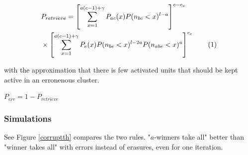 \documentclass[english,10pt,twocolumn]{IEEEtran}
\newcommand\numberthis{\addtocounter{equation}{1}\tag{\theequation}}
\theoremstyle{definition}
\begin{document}
		\begin{align*}
	&P_{retrieve} = \left [ \sum_{x = 1}^{a(c-1) + \gamma} P_{ac}(x) P(n_{bc} < x)^{l-a} \right ]^{c - c_e}\\ 
	 &\times \left [ \sum_{x = 1}^{a(c-1) +\gamma} P_e(x) P(n_{be} < x)^{l-2a} P(n_{abe} < x)^a \right ]^{c_e} \numberthis \label{from_err_th}
	\end{align*}
	
	with the approximation that there is few activated units that should be kept active in an erronenous cluster.

	
	$P_{err} = 1 - P_{retrieve}$	

	
	
	\subsubsection{Simulations}
	See Figure \ref{corruptth} compares the two rules.
	"$a$-winners take all" better than "winner takes all" with errors instead of erasures, even for one iteration.
	
\end{document}

